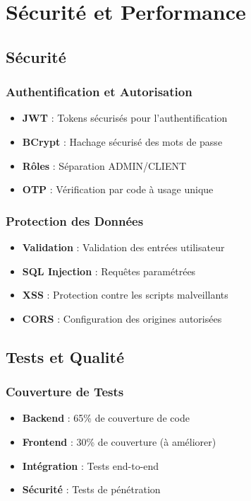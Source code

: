 \documentclass[12pt,a4paper]{report}
\begin{document}
\chapter{Sécurité et Performance}

\section{Sécurité}

\subsection{Authentification et Autorisation}

\begin{itemize}
    \item \textbf{JWT} : Tokens sécurisés pour l'authentification
    \item \textbf{BCrypt} : Hachage sécurisé des mots de passe
    \item \textbf{Rôles} : Séparation ADMIN/CLIENT
    \item \textbf{OTP} : Vérification par code à usage unique
\end{itemize}

\subsection{Protection des Données}

\begin{itemize}
    \item \textbf{Validation} : Validation des entrées utilisateur
    \item \textbf{SQL Injection} : Requêtes paramétrées
    \item \textbf{XSS} : Protection contre les scripts malveillants
    \item \textbf{CORS} : Configuration des origines autorisées
\end{itemize}

\section{Tests et Qualité}

\subsection{Couverture de Tests}

\begin{itemize}
    \item \textbf{Backend} : 65\% de couverture de code
    \item \textbf{Frontend} : 30\% de couverture (à améliorer)
    \item \textbf{Intégration} : Tests end-to-end
    \item \textbf{Sécurité} : Tests de pénétration
\end{itemize}
\end{document}
